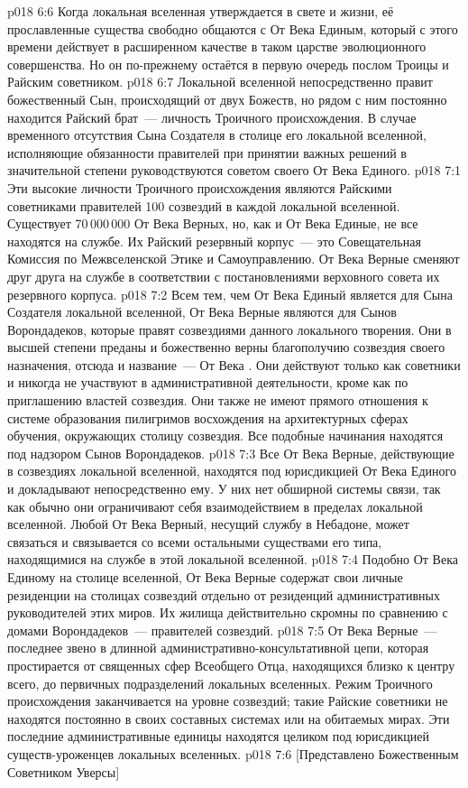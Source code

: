 \vs p018 6:6 Когда локальная вселенная утверждается в свете и жизни, её прославленные существа свободно общаются с От Века Единым, который с этого времени действует в расширенном качестве в таком царстве эволюционного совершенства. Но он по\hyp{}прежнему остаётся в первую очередь послом Троицы и Райским советником.
\vs p018 6:7 Локальной вселенной непосредственно правит божественный Сын, происходящий от двух Божеств, но рядом с ним постоянно находится Райский брат~--- личность Троичного происхождения. В случае временного отсутствия Сына Создателя в столице его локальной вселенной, исполняющие обязанности правителей при принятии важных решений в значительной степени руководствуются советом своего От Века Единого.
\vs p018 7:1 Эти высокие личности Троичного происхождения являются Райскими советниками правителей 100 созвездий в каждой локальной вселенной. Существует 70\,000\,000 От Века Верных, но, как и От Века Единые, не все находятся на службе. Их Райский резервный корпус~--- это Совещательная Комиссия по Межвселенской Этике и Самоуправлению. От Века Верные сменяют друг друга на службе в соответствии с постановлениями верховного совета их резервного корпуса.
\vs p018 7:2 Всем тем, чем От Века Единый является для Сына Создателя локальной вселенной, От Века Верные являются для Сынов Ворондадеков, которые правят созвездиями данного локального творения. Они в высшей степени преданы и божественно верны благополучию созвездия своего назначения, отсюда и название~--- От Века . Они действуют только как советники и никогда не участвуют в административной деятельности, кроме как по приглашению властей созвездия. Они также не имеют прямого отношения к системе образования пилигримов восхождения на архитектурных сферах обучения, окружающих столицу созвездия. Все подобные начинания находятся под надзором Сынов Ворондадеков.
\vs p018 7:3 Все От Века Верные, действующие в созвездиях локальной вселенной, находятся под юрисдикцией От Века Единого и докладывают непосредственно ему. У них нет обширной системы связи, так как обычно они ограничивают себя взаимодействием в пределах локальной вселенной. Любой От Века Верный, несущий службу в Небадоне, может связаться и связывается со всеми остальными существами его типа, находящимися на службе в этой локальной вселенной.
\vs p018 7:4 Подобно От Века Единому на столице вселенной, От Века Верные содержат свои личные резиденции на столицах созвездий отдельно от резиденций административных руководителей этих миров. Их жилища действительно скромны по сравнению с домами Ворондадеков~--- правителей созвездий.
\vs p018 7:5 От Века Верные~--- последнее звено в длинной административно\hyp{}консультативной цепи, которая простирается от священных сфер Всеобщего Отца, находящихся близко к центру всего, до первичных подразделений локальных вселенных. Режим Троичного происхождения заканчивается на уровне созвездий; такие Райские советники не находятся постоянно в своих составных системах или на обитаемых мирах. Эти последние административные единицы находятся целиком под юрисдикцией существ\hyp{}уроженцев локальных вселенных.
\vsetoff
\vs p018 7:6 [Представлено Божественным Советником Уверсы]
\quizlink
